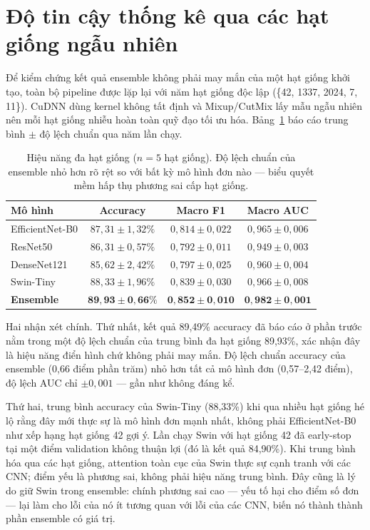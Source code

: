 \section{Độ tin cậy thống kê qua các hạt giống ngẫu nhiên}

Để kiểm chứng kết quả ensemble không phải may mắn của một hạt giống khởi tạo, toàn bộ pipeline được lặp lại với năm hạt giống độc lập (\{42, 1337, 2024, 7, 11\}). CuDNN dùng kernel không tất định và Mixup/CutMix lấy mẫu ngẫu nhiên nên mỗi hạt giống nhiễu hoàn toàn quỹ đạo tối ưu hóa. Bảng~\ref{tab:multiseed_vn} báo cáo trung bình $\pm$ độ lệch chuẩn qua năm lần chạy.

\begin{table}[H]
\centering
\caption{Hiệu năng đa hạt giống ($n=5$ hạt giống). Độ lệch chuẩn của ensemble nhỏ hơn rõ rệt so với bất kỳ mô hình đơn nào --- biểu quyết mềm hấp thụ phương sai cấp hạt giống.}
\label{tab:multiseed_vn}
\begin{tabular}{lccc}
\toprule
\textbf{Mô hình} & \textbf{Accuracy} & \textbf{Macro F1} & \textbf{Macro AUC} \\
\midrule
EfficientNet-B0  & $87{,}31 \pm 1{,}32\%$ & $0{,}814 \pm 0{,}022$ & $0{,}965 \pm 0{,}006$ \\
ResNet50         & $86{,}31 \pm 0{,}57\%$ & $0{,}792 \pm 0{,}011$ & $0{,}949 \pm 0{,}003$ \\
DenseNet121      & $85{,}62 \pm 2{,}42\%$ & $0{,}797 \pm 0{,}025$ & $0{,}960 \pm 0{,}004$ \\
Swin-Tiny        & $88{,}33 \pm 1{,}96\%$ & $0{,}839 \pm 0{,}030$ & $0{,}966 \pm 0{,}008$ \\
\midrule
\textbf{Ensemble} & $\mathbf{89{,}93 \pm 0{,}66\%}$ & $\mathbf{0{,}852 \pm 0{,}010}$ & $\mathbf{0{,}982 \pm 0{,}001}$ \\
\bottomrule
\end{tabular}
\end{table}

Hai nhận xét chính. Thứ nhất, kết quả 89,49\% accuracy đã báo cáo ở phần trước nằm trong một độ lệch chuẩn của trung bình đa hạt giống 89,93\%, xác nhận đây là hiệu năng điển hình chứ không phải may mắn. Độ lệch chuẩn accuracy của ensemble (0,66 điểm phần trăm) nhỏ hơn tất cả mô hình đơn (0,57--2,42 điểm), độ lệch AUC chỉ $\pm 0{,}001$ --- gần như không đáng kể.

Thứ hai, trung bình accuracy của Swin-Tiny (88,33\%) khi qua nhiều hạt giống hé lộ rằng đây mới thực sự là mô hình đơn mạnh nhất, không phải EfficientNet-B0 như xếp hạng hạt giống 42 gợi ý. Lần chạy Swin với hạt giống 42 đã early-stop tại một điểm validation không thuận lợi (đó là kết quả 84,90\%). Khi trung bình hóa qua các hạt giống, attention toàn cục của Swin thực sự cạnh tranh với các CNN; điểm yếu là phương sai, không phải hiệu năng trung bình. Đây cũng là lý do giữ Swin trong ensemble: chính phương sai cao --- yếu tố hại cho điểm số đơn --- lại làm cho lỗi của nó ít tương quan với lỗi của các CNN, biến nó thành thành phần ensemble có giá trị.

